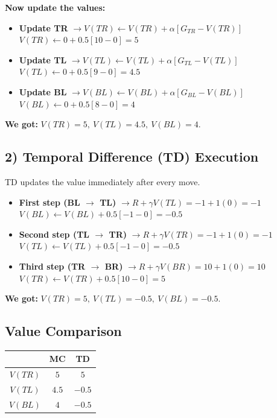 \documentclass[12pt]{article}
\begin{document}
\noindent\textbf{Now update the values:}
\begin{itemize}[label=$\bullet$]
    \item \textbf{Update TR} $\rightarrow V(TR) \leftarrow V(TR) + \alpha [G_{TR} - V(TR)]$ \\
    $V(TR) \leftarrow 0 + 0.5[10 - 0] = 5$
    \item \textbf{Update TL} $\rightarrow V(TL) \leftarrow V(TL) + \alpha [G_{TL} - V(TL)]$ \\
    $V(TL) \leftarrow 0 + 0.5[9 - 0] = 4.5$
    \item \textbf{Update BL} $\rightarrow V(BL) \leftarrow V(BL) + \alpha [G_{BL} - V(BL)]$ \\
    $V(BL) \leftarrow 0 + 0.5[8 - 0] = 4$
\end{itemize}

\noindent \textbf{We got:} $V(TR)=5, \ V(TL)=4.5, \ V(BL)=4$.

\subsection*{2) Temporal Difference (TD) Execution}
TD updates the value immediately after every move.

\begin{itemize}[label=$\bullet$]
    \item \textbf{First step (BL $\rightarrow$ TL)} $\rightarrow R + \gamma V(TL) = -1 + 1(0) = -1$ \\
    $V(BL) \leftarrow V(BL) + 0.5[-1 - 0] = -0.5$
    \item \textbf{Second step (TL $\rightarrow$ TR)} $\rightarrow R + \gamma V(TR) = -1 + 1(0) = -1$ \\
    $V(TL) \leftarrow V(TL) + 0.5[-1 - 0] = -0.5$
    \item \textbf{Third step (TR $\rightarrow$ BR)} $\rightarrow R + \gamma V(BR) = 10 + 1(0) = 10$ \\
    $V(TR) \leftarrow V(TR) + 0.5[10 - 0] = 5$
\end{itemize}

\noindent \textbf{We got:} $V(TR)=5, \ V(TL)=-0.5, \ V(BL)=-0.5$.

\subsection*{Value Comparison}
\begin{table}[h!]
\centering
\renewcommand{\arraystretch}{1.5}
\begin{tabular}{|c|c|c|}
\hline
& \textbf{MC} & \textbf{TD} \\ \hline
\textbf{$V(TR)$} & $5$ & $5$ \\ \hline
\textbf{$V(TL)$} & $4.5$ & $-0.5$ \\ \hline
\textbf{$V(BL)$} & $4$ & $-0.5$ \\ \hline
\end{tabular}
\end{table}
\end{document}
